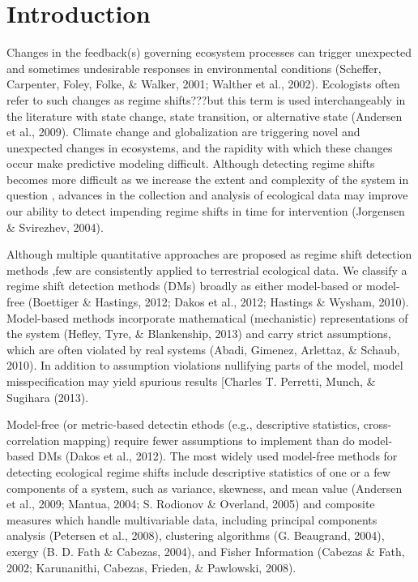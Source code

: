 \documentclass[12pt,twoside,openany]{reedthesis}
\begin{document}
\section{Introduction}\label{introduction-1}

Changes in the feedback(s) governing ecosystem processes can trigger
unexpected and sometimes undesirable responses in environmental
conditions (Scheffer, Carpenter, Foley, Folke, \& Walker, 2001; Walther
et al., 2002). Ecologists often refer to such changes as regime
shifts???but this term is used interchangeably in the literature with
state change, state transition, or alternative state (Andersen et al.,
2009). Climate change and globalization are triggering novel and
unexpected changes in ecosystems, and the rapidity with which these
changes occur make predictive modeling difficult. Although detecting
regime shifts becomes more difficult as we increase the extent and
complexity of the system in question , advances in the collection and
analysis of ecological data may improve our ability to detect impending
regime shifts in time for intervention (Jorgensen \& Svirezhev, 2004).

Although multiple quantitative approaches are proposed as regime shift
detection methods ,few are consistently applied to terrestrial
ecological data. We classify a regime shift detection methods (DMs)
broadly as either model-based or model-free (Boettiger \& Hastings,
2012; Dakos et al., 2012; Hastings \& Wysham, 2010). Model-based methods
incorporate mathematical (mechanistic) representations of the system
(Hefley, Tyre, \& Blankenship, 2013) and carry strict assumptions, which
are often violated by real systems (Abadi, Gimenez, Arlettaz, \& Schaub,
2010). In addition to assumption violations nullifying parts of the
model, model misspecification may yield spurious results {[}Charles T.
Perretti, Munch, \& Sugihara (2013).

Model-free (or metric-based detectin ethods (e.g., descriptive
statistics, cross-correlation mapping) require fewer assumptions to
implement than do model-based DMs (Dakos et al., 2012). The most widely
used model-free methods for detecting ecological regime shifts include
descriptive statistics of one or a few components of a system, such as
variance, skewness, and mean value (Andersen et al., 2009; Mantua, 2004;
S. Rodionov \& Overland, 2005) and composite measures which handle
multivariable data, including principal components analysis (Petersen et
al., 2008), clustering algorithms (G. Beaugrand, 2004), exergy (B. D.
Fath \& Cabezas, 2004), and Fisher Information (Cabezas \& Fath, 2002;
Karunanithi, Cabezas, Frieden, \& Pawlowski, 2008).
\end{document}

